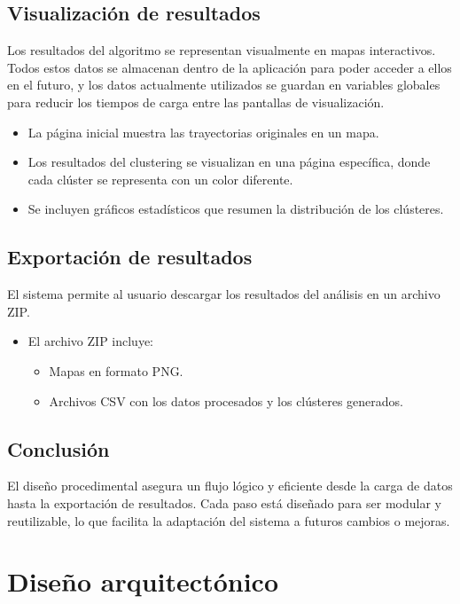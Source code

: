 \subsection{Visualización de resultados}

Los resultados del algoritmo se representan visualmente en mapas interactivos. Todos estos datos se almacenan dentro de la aplicación para poder acceder a ellos en el futuro, y los datos actualmente utilizados se guardan en variables globales para reducir los tiempos de carga entre las pantallas de visualización.

\begin{itemize}
    \item La página inicial muestra las trayectorias originales en un mapa.
    \item Los resultados del clustering se visualizan en una página específica, donde cada clúster se representa con un color diferente.
    \item Se incluyen gráficos estadísticos que resumen la distribución de los clústeres.
\end{itemize}

\subsection{Exportación de resultados}

El sistema permite al usuario descargar los resultados del análisis en un archivo ZIP.

\begin{itemize}
    \item El archivo ZIP incluye:
    \begin{itemize}
        \item Mapas en formato PNG.
        \item Archivos CSV con los datos procesados y los clústeres generados.
    \end{itemize}
\end{itemize}

\subsection{Conclusión}

El diseño procedimental asegura un flujo lógico y eficiente desde la carga de datos hasta la exportación de resultados. Cada paso está diseñado para ser modular y reutilizable, lo que facilita la adaptación del sistema a futuros cambios o mejoras.

\section{Diseño arquitectónico}

